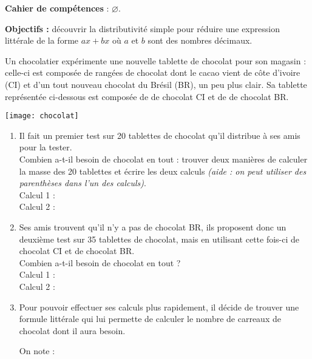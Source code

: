 \textcolor{PartieGeometrie}{\sffamily\bfseries Cahier de compétences} : $\varnothing$.


\activites

\begin{activite}
   {\bf Objectifs :} découvrir la distributivité simple pour réduire une expression littérale de la forme $ax+bx$ où $a$ et $b$ sont des nombres décimaux.
   \begin{QCM}
      Un chocolatier expérimente une nouvelle tablette de chocolat pour son magasin : celle-ci est composée de rangées de chocolat dont le cacao vient de côte d'ivoire (CI) et d'un tout nouveau chocolat du Brésil (BR), un peu plus clair. Sa tablette représentée ci-dessous est composée de  de chocolat CI et de  de chocolat BR.
      \begin{center}
         \texttt{[image: chocolat]}
      \end{center}
      \begin{enumerate}
         \item Il fait un premier test sur 20 tablettes de chocolat qu'il distribue à ses amis pour la tester. \\
            Combien a-t-il besoin de chocolat en tout : trouver deux manières de calculer la masse des 20 tablettes et écrire les deux calculs {\it (aide : on peut utiliser des parenthèses dans l'un des calculs)}. \\ [3mm]
            Calcul 1 : \pf \\ [3mm]
            Calcul 2 : \pf \bigskip
         \item Ses amis trouvent qu'il n'y a pas de chocolat BR, ils proposent donc un deuxième test sur 35 tablettes de chocolat, mais en utilisant cette fois-ci  de chocolat CI et  de chocolat BR. \\
            Combien a-t-il besoin de chocolat en tout ? \\ [3mm]
            Calcul 1 : \pf \\ [3mm]
            Calcul 2 : \pf \bigskip
         \item Pour pouvoir effectuer ses calculs plus rapidement, il décide de trouver une formule littérale qui lui permette de calculer le nombre de carreaux de chocolat dont il aura besoin. \\
         \begin{minipage}{8cm}
            On note :
            \begin{itemize}

\end{itemize}
\end{minipage}
\end{enumerate}
\end{QCM}
\end{activite}

